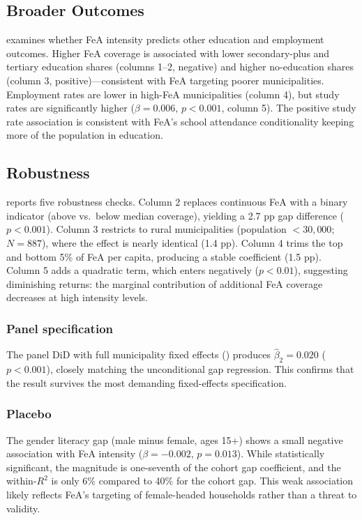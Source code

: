 \documentclass[12pt]{article}
\begin{document}
\subsection{Broader Outcomes}

{\small}

 examines whether FeA intensity predicts other education and employment outcomes. Higher FeA coverage is associated with lower secondary-plus and tertiary education shares (columns 1--2, negative) and higher no-education shares (column 3, positive)---consistent with FeA targeting poorer municipalities. Employment rates are lower in high-FeA municipalities (column 4), but study rates are significantly higher ($\beta = 0.006$, $p < 0.001$, column 5). The positive study rate association is consistent with FeA's school attendance conditionality keeping more of the population in education.

\subsection{Robustness}

{\small}

 reports five robustness checks. Column 2 replaces continuous FeA with a binary indicator (above vs.\ below median coverage), yielding a 2.7 pp gap difference ($p < 0.001$). Column 3 restricts to rural municipalities (population $< 30{,}000$; $N = 887$), where the effect is nearly identical (1.4 pp). Column 4 trims the top and bottom 5\% of FeA per capita, producing a stable coefficient (1.5 pp). Column 5 adds a quadratic term, which enters negatively ($p < 0.01$), suggesting diminishing returns: the marginal contribution of additional FeA coverage decreases at high intensity levels.

\subsubsection*{Panel specification} The panel DiD with full municipality fixed effects () produces $\hat{\beta}_2 = 0.020$ ($p < 0.001$), closely matching the unconditional gap regression. This confirms that the result survives the most demanding fixed-effects specification.

\subsubsection*{Placebo} The gender literacy gap (male minus female, ages 15+) shows a small negative association with FeA intensity ($\beta = -0.002$, $p = 0.013$). While statistically significant, the magnitude is one-seventh of the cohort gap coefficient, and the within-$R^2$ is only 6\% compared to 40\% for the cohort gap. This weak association likely reflects FeA's targeting of female-headed households rather than a threat to validity.
\end{document}
